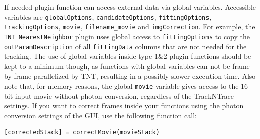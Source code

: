 \documentclass[11pt,onside]{report}
\numberwithin{equation}{chapter}
\begin{document}
If needed plugin function can access external data via global variables. Accessible variables are \texttt{globalOptions}, \texttt{candidateOptions}, \texttt{fittingOptions}, \texttt{trackingOptions}, \texttt{movie}, \texttt{filename\_movie} and \texttt{imgCorrection}. For example, the \texttt{TNT NearestNeighbor} plugin uses global access to  \texttt{fittingOptions} to copy the \texttt{outParamDescription} of all \texttt{fittingData} columns that are not needed for the tracking. The use of global variables inside type 1\&2 plugin functions should be kept to a minimum though, as functions with global variables can not be frame-by-frame parallelized by TNT, resulting in a possibly slower execution time. Also note that, for memory reasons, the global \texttt{movie} variable gives access to the 16-bit input movie without photon conversion, regardless of the TrackNTrace settings. If you want to correct frames inside your functions using the photon conversion settings of the GUI, use the following function call:
\begin{lstlisting}[style=Matlab-editor]
  [correctedStack] = correctMovie(movieStack)
\end{lstlisting}
\end{document}
